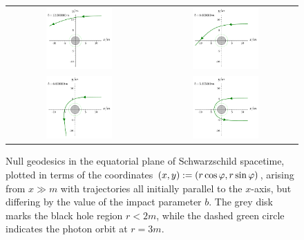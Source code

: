 \begin{figure}
\begin{tabular}{cc}
\includegraphics[width=0.48\textwidth]{ges_null_b_12_000000.pdf} &
\includegraphics[width=0.48\textwidth]{ges_null_b_8_000000.pdf} \\
\includegraphics[width=0.48\textwidth]{ges_null_b_6_000000.pdf} &
\includegraphics[width=0.48\textwidth]{ges_null_b_5_355000.pdf}
\end{tabular}
\caption[]{\label{f:ges:null_b1} \footnotesize
Null geodesics in the equatorial plane of Schwarzschild spacetime,
plotted in terms of the coordinates $(x,y) := (r\cos\varphi, r\sin\varphi)$,
arising from $x\gg m$ with trajectories all initially parallel to the $x$-axis,
but differing by the value of the impact parameter $b$.
The grey disk marks the black hole
region $r<2m$, while the dashed green circle indicates the photon orbit
at $r=3m$.}
\end{figure}

